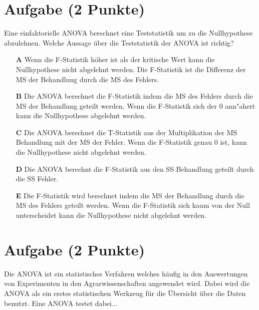 \documentclass[a4paper, 9pt]{scrartcl}\usepackage[]{graphicx}\usepackage[]{xcolor}
\begin{document}
\section{Aufgabe \hfill (2 Punkte)}



Eine einfaktorielle ANOVA berechnet eine Teststatistik um zu die Nullhypothese abzulehnen. Welche Aussage über die Teststatistik der ANOVA ist richtig?



\begin{enumerate}
\item [\textbf{A} \msquare] Wenn die F-Statistik höher ist als der kritische Wert kann die Nullhypothese nicht abgelehnt werden. Die F-Statistik ist die Differenz der MS der Behandlung durch die MS des Fehlers.
\item [\textbf{B} \msquare] Die ANOVA berechnet die F-Statistik indem die MS des Fehlers durch die MS der Behandlung geteilt werden. Wenn die F-Statistik sich der 0 ann{"a}hert kann die Nullhypothese abgelehnt werden.
\item [\textbf{C} \msquare] Die ANOVA berechnet die T-Statistik aus der Multiplikation der MS Behandlung mit der MS der Fehler. Wenn die F-Statistik genau 0 ist, kann die Nullhypothese nicht abgelehnt werden.
\item [\textbf{D} \msquare] Die ANOVA berechnt die F-Statistik aus den SS Behandlung geteilt durch die SS Fehler.
\item [\textbf{E} \msquare] Die F-Statistik wird berechnet indem die MS der Behandlung durch die MS des Fehlers geteilt werden. Wenn die F-Statistik sich kaum von der Null unterscheidet kann die Nullhypothese nicht abgelehnt werden.
\end{enumerate} 

\section{Aufgabe \hfill (2 Punkte)}




Die ANOVA ist ein statistisches Verfahren welches häufig in den Auswertungen von Experimenten in den Agrarwissenschaften angewendet
wird. Dabei wird die ANOVA als ein erstes statistischen Werkzeug für die
Übersicht über die Daten benutzt. Eine ANOVA testet dabei...
\end{document}
